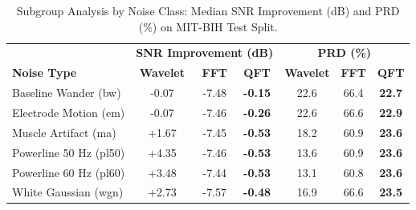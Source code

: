 \begin{table}[t]
\centering
\caption{Subgroup Analysis by Noise Class: Median SNR Improvement (dB) and PRD (\%) on MIT-BIH Test Split.}
\label{tab:noise_types}
\begin{tabular}{lcccccc}
\hline
 & \multicolumn{3}{c}{\textbf{SNR Improvement (dB)}} & \multicolumn{3}{c}{\textbf{PRD (\%)}}\\
\textbf{Noise Type} & \textbf{Wavelet} & \textbf{FFT} & \textbf{QFT} & \textbf{Wavelet} & \textbf{FFT} & \textbf{QFT} \\
\hline
Baseline Wander (bw) & -0.07 & -7.48 & \textbf{-0.15} & 22.6 & 66.4 & \textbf{22.7} \\
Electrode Motion (em) & -0.07 & -7.46 & \textbf{-0.26} & 22.6 & 66.6 & \textbf{22.9} \\
Muscle Artifact (ma) & +1.67 & -7.45 & \textbf{-0.53} & 18.2 & 60.9 & \textbf{23.6} \\
Powerline 50 Hz (pl50) & +4.35 & -7.46 & \textbf{-0.53} & 13.6 & 60.9 & \textbf{23.6} \\
Powerline 60 Hz (pl60) & +3.48 & -7.44 & \textbf{-0.53} & 13.1 & 60.8 & \textbf{23.6} \\
White Gaussian (wgn) & +2.73 & -7.57 & \textbf{-0.48} & 16.9 & 66.6 & \textbf{23.5} \\
\hline
\end{tabular}
\end{table}
